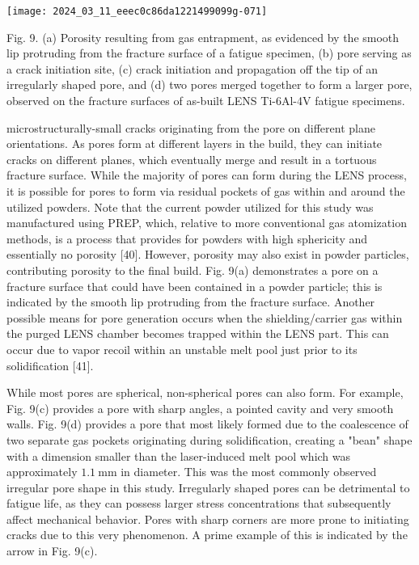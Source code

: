 \documentclass[10pt]{article}
\begin{document}
\begin{center}
\texttt{[image: 2024\_03\_11\_eeec0c86da1221499099g-071]}
\end{center}

Fig. 9. (a) Porosity resulting from gas entrapment, as evidenced by the smooth lip protruding from the fracture surface of a fatigue specimen, (b) pore serving as a crack initiation site, (c) crack initiation and propagation off the tip of an irregularly shaped pore, and (d) two pores merged together to form a larger pore, observed on the fracture surfaces of as-built LENS Ti-6Al-4V fatigue specimens.

microstructurally-small cracks originating from the pore on different plane orientations. As pores form at different layers in the build, they can initiate cracks on different planes, which eventually merge and result in a tortuous fracture surface. While the majority of pores can form during the LENS process, it is possible for pores to form via residual pockets of gas within and around the utilized powders. Note that the current powder utilized for this study was manufactured using PREP, which, relative to more conventional gas atomization methods, is a process that provides for powders with high sphericity and essentially no porosity [40]. However, porosity may also exist in powder particles, contributing porosity to the final build. Fig. 9(a) demonstrates a pore on a fracture surface that could have been contained in a powder particle; this is indicated by the smooth lip protruding from the fracture surface. Another possible means for pore generation occurs when the shielding/carrier gas within the purged LENS chamber becomes trapped within the LENS part. This can occur due to vapor recoil within an unstable melt pool just prior to its solidification [41].

While most pores are spherical, non-spherical pores can also form. For example, Fig. 9(c) provides a pore with sharp angles, a pointed cavity and very smooth walls. Fig. 9(d) provides a pore that most likely formed due to the coalescence of two separate gas pockets originating during solidification, creating a "bean" shape with a dimension smaller than the laser-induced melt pool which was approximately $1.1 \mathrm{~mm}$ in diameter. This was the most commonly observed irregular pore shape in this study. Irregularly shaped pores can be detrimental to fatigue life, as they can possess larger stress concentrations that subsequently affect mechanical behavior. Pores with sharp corners are more prone to initiating cracks due to this very phenomenon. A prime example of this is indicated by the arrow in Fig. 9(c).
\end{document}
